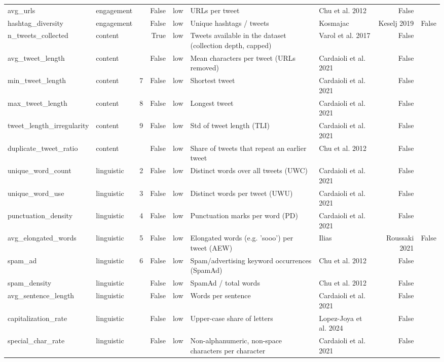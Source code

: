 \begin{tabular}{lllrlllr}
avg_urls & engagement &  & False & low & URLs per tweet & Chu et al. 2012 & False \\
hashtag_diversity & engagement &  & False & low & Unique hashtags / tweets & Kosmajac & Keselj 2019 & False \\
n_tweets_collected & content &  & True & low & Tweets available in the dataset (collection depth, capped) & Varol et al. 2017 & False \\
avg_tweet_length & content &  & False & low & Mean characters per tweet (URLs removed) & Cardaioli et al. 2021 & False \\
min_tweet_length & content & 7 & False & low & Shortest tweet & Cardaioli et al. 2021 & False \\
max_tweet_length & content & 8 & False & low & Longest tweet & Cardaioli et al. 2021 & False \\
tweet_length_irregularity & content & 9 & False & low & Std of tweet length (TLI) & Cardaioli et al. 2021 & False \\
duplicate_tweet_ratio & content &  & False & low & Share of tweets that repeat an earlier tweet & Chu et al. 2012 & False \\
unique_word_count & linguistic & 2 & False & low & Distinct words over all tweets (UWC) & Cardaioli et al. 2021 & False \\
unique_word_use & linguistic & 3 & False & low & Distinct words per tweet (UWU) & Cardaioli et al. 2021 & False \\
punctuation_density & linguistic & 4 & False & low & Punctuation marks per word (PD) & Cardaioli et al. 2021 & False \\
avg_elongated_words & linguistic & 5 & False & low & Elongated words (e.g. 'sooo') per tweet (AEW) & Ilias & Roussaki 2021 & False \\
spam_ad & linguistic & 6 & False & low & Spam/advertising keyword occurrences (SpamAd) & Chu et al. 2012 & False \\
spam_density & linguistic &  & False & low & SpamAd / total words & Chu et al. 2012 & False \\
avg_sentence_length & linguistic &  & False & low & Words per sentence & Cardaioli et al. 2021 & False \\
capitalization_rate & linguistic &  & False & low & Upper-case share of letters & Lopez-Joya et al. 2024 & False \\
special_char_rate & linguistic &  & False & low & Non-alphanumeric, non-space characters per character & Cardaioli et al. 2021 & False \\

\end{tabular}
